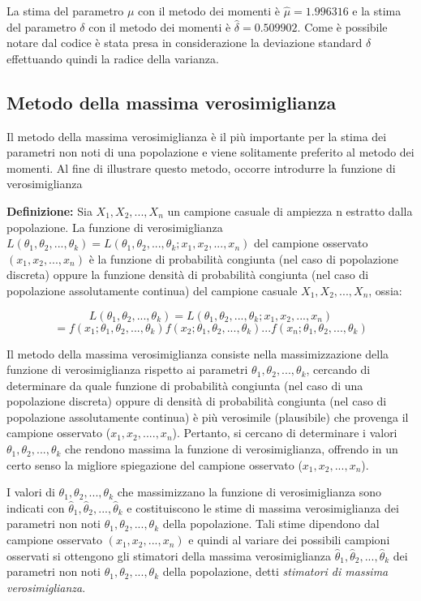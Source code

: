 La stima del parametro $\mu$ con il metodo dei momenti è $\hat{\mu} = 1.996316$ e la stima del parametro $\delta$ con il metodo dei momenti è $\hat{\delta} = 0.509902$. Come è possibile notare dal codice è stata presa in considerazione la deviazione standard $\delta$ effettuando quindi la radice della varianza.

\subsection{Metodo della massima verosimiglianza}

Il metodo della massima verosimiglianza è il più importante per la stima dei parametri non noti di una popolazione e viene solitamente preferito al metodo dei momenti. Al fine di illustrare questo metodo, occorre introdurre la funzione di verosimiglianza

\noindent \textbf{Definizione:} Sia $X_1, X_2, ..., X_n$ un campione casuale di ampiezza n estratto dalla popolazione. La funzione di verosimiglianza $L(\theta_1, \theta_2, ..., \theta_k) =L(\theta_1, \theta_2, ..., \theta_k ; x_1, x_2, ..., x_n)$ del campione osservato $(x_1, x_2, ..., x_n)$ è la funzione di probabilità congiunta (nel caso di popolazione discreta) oppure la funzione densità di probabilità congiunta (nel caso di popolazione assolutamente continua) del campione casuale $X_1, X_2, ..., X_n$, ossia:

\[L(\theta_1, \theta_2, ..., \theta_k) =L(\theta_1, \theta_2, ..., \theta_k ; x_1, x_2, ..., x_n) \]
\[= f(x_1;\theta_1, \theta_2, ..., \theta_k) f(x_2;\theta_1, \theta_2, ..., \theta_k) ... f(x_n;\theta_1, \theta_2, ..., \theta_k)\]

Il metodo della massima verosimiglianza consiste nella massimizzazione della funzione di verosimiglianza rispetto ai parametri $\theta_1, \theta_2, ..., \theta_k$, cercando di determinare da quale funzione di probabilità congiunta (nel caso di una popolazione discreta) oppure di densità di probabilità congiunta (nel caso di popolazione assolutamente continua) è più verosimile (plausibile) che provenga il campione osservato ($x_1, x_2, ...., x_n$). Pertanto, si cercano di determinare i valori $\theta_1, \theta_2, ..., \theta_k$ che rendono massima la funzione di verosimiglianza, offrendo in un certo senso la migliore spiegazione del campione osservato ($x_1, x_2, ..., x_n$).

I valori di $\theta_1, \theta_2, ..., \theta_k$ che massimizzano la funzione di verosimiglianza sono indicati con $\hat\theta_1, \hat\theta_2, ..., \hat\theta_k$ e costituiscono le stime di massima verosimiglianza dei parametri non noti $\theta_1, \theta_2, ..., \theta_k$ della popolazione. Tali stime dipendono dal campione osservato $(x_1, x_2, ..., x_n)$ e quindi al variare dei possibili campioni osservati si ottengono gli stimatori della massima verosimiglianza $\hat\theta_1, \hat\theta_2, ..., \hat\theta_k$ dei parametri non noti $\theta_1, \theta_2, ..., \theta_k$ della popolazione, detti \textit{stimatori di massima verosimiglianza}.

